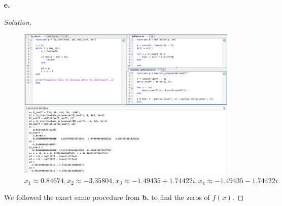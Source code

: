 \documentclass{article}
\begin{document}
\begin{enumerate}
\begin{proof}[Solution]
        
        \emph{Figure 7:} We solve $Q_2(x)$ by quadratic formula  and get $x_3\approx0.58356 + 1.49419i$ and 
        $x_4 \approx 0.58356 - 1.49419i$.
    \end{proof}

    \item[\textbf{e.}]
    \begin{proof}[Solution]\indent        
        \begin{figure}[htb!]
            \centering
            \includegraphics[scale=0.25]{2.6.2e.png}
            \caption{$x_1\approx 0.84674, x_2\approx -3.35804, x_3 \approx -1.49435 + 1.74422i,
            x_4\approx -1.49435 - 1.74422i$}
        \end{figure}

        We followed the exact same procedure from \textbf{b.} to find the zeros of $f(x)$.
    \end{proof}
\end{enumerate}

\newpage
\end{document}
